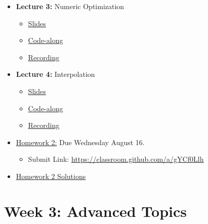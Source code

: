 \documentclass[
]{book}
\providecommand{\tightlist}{%
  \setlength{\itemsep}{0pt}\setlength{\parskip}{0pt}}
\begin{document}
\begin{itemize}
\tightlist
\item
  \textbf{Lecture 3:} Numeric Optimization

  \begin{itemize}
  \tightlist
  \item
    \href{https://kevinghunt.github.io/ComputationCamp/lectures/Lecture3.html}{Slides}
  \item
    \href{https://kevinghunt.github.io/ComputationCamp/codealongs/CodeAlong3.jl}{Code-along}
  \item
    \href{https://uwmadison.zoom.us/rec/share/xD1LsrLsUF8XtJUjPTVDA_2d52EKgQTF1a6Dc3lBOSB7JlRk4PMUi_h0oMRnMtb5.VW6mJ7BkoiC6riUk}{Recording}
  \end{itemize}
\item
  \textbf{Lecture 4:} Interpolation

  \begin{itemize}
  \tightlist
  \item
    \href{https://kevinghunt.github.io/ComputationCamp/lectures/Lecture4.html}{Slides}
  \item
    \href{https://kevinghunt.github.io/ComputationCamp/codealongs/CodeAlong4.jl}{Code-along}
  \item
    \href{https://uwmadison.zoom.us/rec/share/YNnLYBVpnTSQsMTHQGDDWx2n89gURdYXzVWM8dRyV4o91bAfmCkC8q1IT3f-jo3B.msXmwKB-ZcXcIZRL}{Recording}
  \end{itemize}
\item
  \href{https://kevinghunt.github.io/ComputationCamp/homeworks/homework2.html}{Homework 2:} Due Wednesday August 16.

  \begin{itemize}
  \tightlist
  \item
    Submit Link: \url{https://classroom.github.com/a/gYCf0Llh}
  \end{itemize}
\item
  \href{https://kevinghunt.github.io/ComputationCamp/homework_solutions/Homework2_solutions.jl}{Homework 2 Solutions}
\end{itemize}

\hypertarget{week-3-advanced-topics-1}{%
\section{Week 3: Advanced Topics}\label{week-3-advanced-topics-1}}
\end{document}
